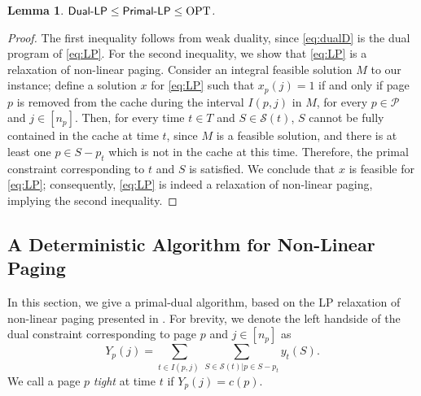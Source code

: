 \documentclass[11pt]{article}
\newcommand{\cP}{{\mathcal{P}}}
\newcommand{\cS}{{\mathcal{S}}}
\newcommand{\OPT}{\textnormal{OPT}}
\newtheorem{lemma}[thm]{Lemma}
\begin{document}
\begin{lemma}
	\label{lem:relaxation2}
$\textnormal{\textsf{Dual-LP}} \leq \textnormal{\textsf{Primal-LP}} \leq \OPT$.
\end{lemma}

\begin{proof}
	The first inequality follows from weak duality, since \eqref{eq:dualD} is the dual program of \eqref{eq:LP}. For the second inequality, we show that \eqref{eq:LP} is a relaxation of non-linear paging. Consider an integral feasible solution $M$ to our instance; define a solution $x$ for \eqref{eq:LP} such that $x_p(j) = 1$ if and only if page $p$ is removed from the cache during the interval $I(p,j)$ in $M$, for every $p \in \cP$ and $j \in [n_p]$.  Then, for every time $t \in T$ and $S \in \cS(t)$, $S$ cannot be fully contained in the cache at time $t$, since $M$ is a feasible solution, and there is at least one $p \in S-p_t$ which is not in the cache at this time. Therefore, the primal constraint corresponding to $t$ and $S$ is satisfied. We conclude that $x$ is feasible for \eqref{eq:LP}; consequently, \eqref{eq:LP} is indeed a relaxation of non-linear paging, implying the second inequality.   
\end{proof} 


\subsection{A Deterministic Algorithm for Non-Linear Paging}


In this section, we give a primal-dual algorithm, based on the LP relaxation of non-linear paging presented in . For brevity, we denote the left handside of the dual constraint corresponding to page $p$ and $j \in [n_p]$ as
\begin{equation}
	\label{eq:Y}
	Y_p(j) = \sum_{t \in I(p,j)~} \sum_{S \in \cS(t)\big|p \in S-p_t} y_t(S).
\end{equation}
 We call a page $p$ {\em tight} at time $t$ if $Y_p(j) = c(p)$.  
\end{document}
